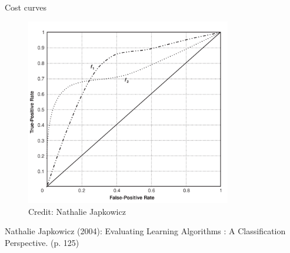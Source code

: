 \begin{vbframe}{Cost curves}
\begin{minipage}{0.49\textwidth}
\begin{figure}
    \centering
    \includegraphics[width=0.8\textwidth]{figure_man/cost-curves-1.png}
    \tiny{\\ Credit: Nathalie Japkowicz  \\}
\end{figure}



\end{minipage}
\vspace{1.5 cm}
{\tiny{Nathalie Japkowicz (2004): Evaluating Learning Algorithms : A Classification Perspective. (p. 125)}}



\end{vbframe}


